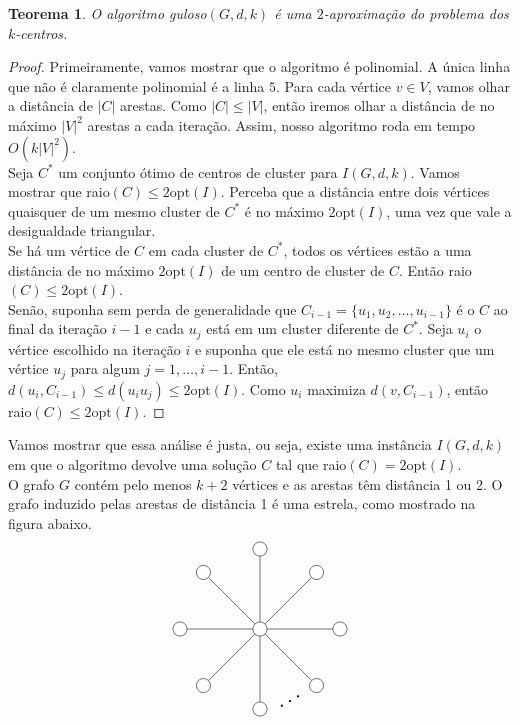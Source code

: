 \documentclass[12pt]{article}
\newcommand{\opt}{\ensuremath{\mathrm{opt}}}
\newtheorem{theorem}{Teorema}[section]
\begin{document}
    \begin{theorem}
        O algoritmo {\sc guloso}$(G,d,k)$ é uma $2$-aproximação do problema dos $k$-centros.
    \end{theorem}
    \begin{proof}
        Primeiramente, vamos mostrar que o algoritmo é polinomial. A única linha que não é claramente polinomial é a linha $5$. Para cada vértice $v \in V$, vamos olhar a distância de $|C|$ arestas. Como $|C| \leq |V|$, então iremos olhar a distância de no máximo $|V|^2$ arestas a cada iteração. Assim, nosso algoritmo roda em tempo $O(k|V|^2)$. \\
        Seja $C^*$ um conjunto ótimo de centros de cluster para $I(G,d,k)$. Vamos mostrar que raio$(C) \leq 2\opt(I) $. Perceba que a distância entre dois vértices quaisquer de um mesmo cluster de $C^*$ é no máximo $2\opt(I)$, uma vez que vale a desigualdade triangular.\\ 
        Se há um vértice de $C$ em cada cluster de $C^*$, todos os vértices estão a uma distância de no máximo $2\opt(I)$ de um centro de cluster de $C$. Então raio$(C) \leq 2\opt(I)$. \\
        Senão, suponha sem perda de generalidade que $C_{i-1} = \{ u_1,u_2,\ldots,u_{i-1}\}$ é o $C$ ao final da iteração $i-1$ e cada $u_j$ está em um cluster diferente de $C^*$. Seja $u_i$ o vértice escolhido na iteração $i$ e suponha que ele está no mesmo cluster que um vértice $u_j$ para algum $j=1,\ldots,i-1$. Então, $d(u_i,C_{i-1}) \leq d(u_iu_j) \leq 2\opt(I)$. Como $u_i$ maximiza $d(v,C_{i-1})$, então raio$(C) \leq 2\opt(I)$.
    \end{proof}
    Vamos mostrar que essa análise é justa, ou seja, existe uma instância $I(G,d,k)$ em que o algoritmo devolve uma solução $C$ tal que raio$(C) = 2 \opt(I)$. \\
    O grafo $G$ contém pelo menos $k+2$ vértices e as arestas têm distância 1 ou 2. O grafo induzido pelas arestas de distância 1 é uma estrela, como mostrado na figura abaixo.
    \[
    \begin{tikzpicture}
        \def\n{8}
        
        \def\r{2cm}
        
        \def\rotationangle{90}
        
        \draw (0,0) node[circle, draw, minimum size=10pt, inner sep=1.5pt] (center) {};
        
        \begin{scope}[rotate=\rotationangle]
          \foreach \i in {1,...,\n} {
            \draw (\i*360/\n:\r) node[circle, draw, minimum size=10pt, inner sep=1.5pt] (\i) {};
          }
        \end{scope}
        
        \foreach \i in {1,...,\n} {
          \draw (center) -- (\i);
        }
        \draw (4) node[shift={(0.75,0.2)}] {\rotatebox{30}{\scalebox{1.5}{$\ldots$}}} (4);
      \end{tikzpicture}
      \] \\
\end{document}
